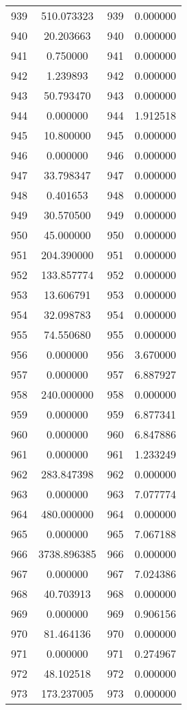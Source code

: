 \documentclass[12pt]{article}
\begin{document}
\begin{longtable}{@{}cccc@{}}
939 & 510.073323 & 939 & 0.000000 \\
940 & 20.203663 & 940 & 0.000000 \\
941 & 0.750000 & 941 & 0.000000 \\
942 & 1.239893 & 942 & 0.000000 \\
943 & 50.793470 & 943 & 0.000000 \\
944 & 0.000000 & 944 & 1.912518 \\
945 & 10.800000 & 945 & 0.000000 \\
946 & 0.000000 & 946 & 0.000000 \\
947 & 33.798347 & 947 & 0.000000 \\
948 & 0.401653 & 948 & 0.000000 \\
949 & 30.570500 & 949 & 0.000000 \\
950 & 45.000000 & 950 & 0.000000 \\
951 & 204.390000 & 951 & 0.000000 \\
952 & 133.857774 & 952 & 0.000000 \\
953 & 13.606791 & 953 & 0.000000 \\
954 & 32.098783 & 954 & 0.000000 \\
955 & 74.550680 & 955 & 0.000000 \\
956 & 0.000000 & 956 & 3.670000 \\
957 & 0.000000 & 957 & 6.887927 \\
958 & 240.000000 & 958 & 0.000000 \\
959 & 0.000000 & 959 & 6.877341 \\
960 & 0.000000 & 960 & 6.847886 \\
961 & 0.000000 & 961 & 1.233249 \\
962 & 283.847398 & 962 & 0.000000 \\
963 & 0.000000 & 963 & 7.077774 \\
964 & 480.000000 & 964 & 0.000000 \\
965 & 0.000000 & 965 & 7.067188 \\
966 & 3738.896385 & 966 & 0.000000 \\
967 & 0.000000 & 967 & 7.024386 \\
968 & 40.703913 & 968 & 0.000000 \\
969 & 0.000000 & 969 & 0.906156 \\
970 & 81.464136 & 970 & 0.000000 \\
971 & 0.000000 & 971 & 0.274967 \\
972 & 48.102518 & 972 & 0.000000 \\
973 & 173.237005 & 973 & 0.000000 \\

\end{longtable}
\end{document}
